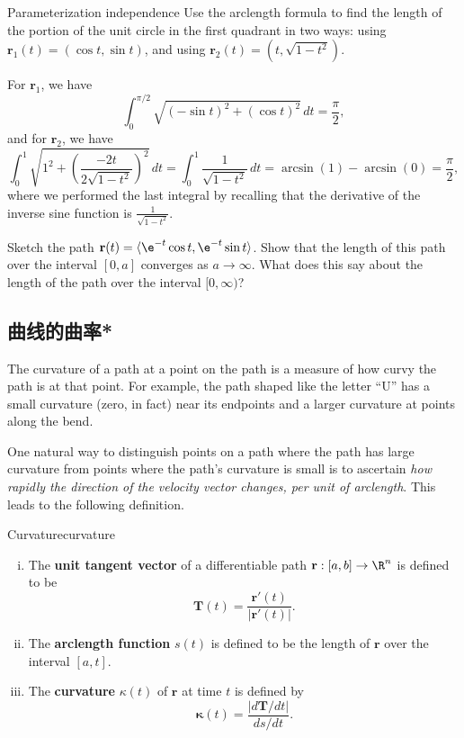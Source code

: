 \documentclass[indent]{watsonbook}
\begin{document}
{\begin{example}{Parameterization independence}{}
  Use the arclength formula to find the length of the portion of the
  unit circle in the first quadrant in two ways: using $\mathbf{r}_1(t)
  = (\cos t, \sin t)$, and using $\mathbf{r}_2(t) = (t,\sqrt{1-t^2})$.
\end{example}

\begin{solution}
  For $\mathbf{r}_1$, we have
  \[
    \int_0^{\pi/2} \sqrt{(-\sin t)^2 + (\cos t)^2} \, {d} t = \boxed{\frac{\pi}{2}},
  \]
  and for $\mathbf{r}_2$, we have
  \[
    \int_0^1 \sqrt{1^2 + \left(\frac{-2t}{2\sqrt{1-t^2}}\right)^2}\, {d}
    t =  \int_0^1 \frac{1}{\sqrt{1-t^2}} \, {d} t = \arcsin(1) -
    \arcsin(0) = \boxed{\frac{\pi}{2}},
  \]
  where we performed the last integral by recalling that the
  derivative of the inverse sine function is
  $\frac{1}{\sqrt{1-t^2}}$.
\end{solution}

\begin{exercise}{}{}
  Sketch the path
  $\mathbf{r}(t) = \langle \e^{-t} \cos t, \e^{-t} \sin t \rangle$. Show
  that the length of this path over the interval $[0,a]$ converges as
  $a\to\infty$. What does this say about the length of the path over
  the interval $[0,\infty)$?
\end{exercise}

\subsection{曲线的曲率*}

The curvature of a path at a point on the path is a measure of how
curvy the path is at that point. For example, the path shaped like the
letter ``\textsf{U}'' has a small curvature (zero, in fact) near its
endpoints and a larger curvature at points along the bend.

One natural way to distinguish points on a path where the path has
large curvature from points where the path's curvature is small is to
ascertain \textit{how rapidly the direction of the velocity vector
  changes, per unit of arclength}. This leads to the following
definition.

\begin{defn}[breakable]{Curvature}{curvature}
  \begin{enumerate}[(i),leftmargin=12pt,topsep=-6pt,itemsep=4pt]
  \item The \textbf{unit tangent vector} of a differentiable path $\mathbf{r}:[a,b]
    \to \R^n$ is defined to be
    \[
      \mathbf{T}(t) = \frac{\mathbf{r}'(t)}{|\mathbf{r}'(t)|}.
    \]
  \item The \textbf{arclength function} $s(t)$ is defined to be the length
    of $\mathbf{r}$ over the interval $[a,t]$.
  \item The \textbf{curvature} $\kappa(t)$ of $\mathbf{r}$ at time $t$ is
    defined by
    \[
      \mathbf{\kappa}(t) = \frac{|d\mathbf{T}/d t|}{d s/d t}.
    \]
  \end{enumerate}
\end{defn}

}
\end{document}
